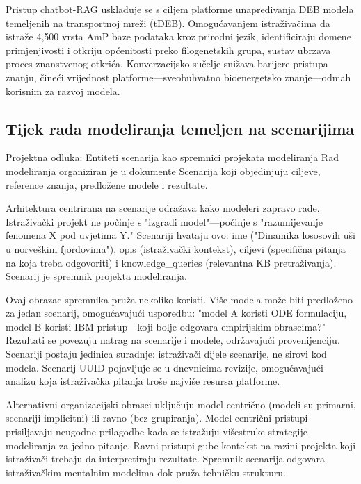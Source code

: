 \documentclass[12pt,a4paper]{article}
\begin{document}
Pristup chatbot-RAG usklađuje se s ciljem platforme unapređivanja DEB modela temeljenih na transportnoj mreži (tDEB). Omogućavanjem istraživačima da istraže 4,500 vrsta AmP baze podataka kroz prirodni jezik, identificiraju domene primjenjivosti i otkriju općenitosti preko filogenetskih grupa, sustav ubrzava proces znanstvenog otkrića. Konverzacijsko sučelje snižava barijere pristupa znanju, čineći vrijednost platforme—sveobuhvatno bioenergetsko znanje—odmah korisnim za razvoj modela.

\subsection{Tijek rada modeliranja temeljen na scenarijima}

\begin{rationale}{Projektna odluka: Entiteti scenarija kao spremnici projekata modeliranja}
Rad modeliranja organiziran je u dokumente Scenarija koji objedinjuju ciljeve, reference znanja, predložene modele i rezultate.
\end{rationale}

Arhitektura centrirana na scenarije odražava kako modeleri zapravo rade. Istraživački projekt ne počinje s "izgradi model"—počinje s "razumijevanje fenomena X pod uvjetima Y." Scenariji hvataju ovo: ime ("Dinamika lososovih uši u norveškim fjordovima"), opis (istraživački kontekst), ciljevi (specifična pitanja na koja treba odgovoriti) i knowledge\_queries (relevantna KB pretraživanja). Scenarij je spremnik projekta modeliranja.

Ovaj obrazac spremnika pruža nekoliko koristi. Više modela može biti predloženo za jedan scenarij, omogućavajući usporedbu: "model A koristi ODE formulaciju, model B koristi IBM pristup—koji bolje odgovara empirijskim obrascima?" Rezultati se povezuju natrag na scenarije i modele, održavajući provenijenciju. Scenariji postaju jedinica suradnje: istraživači dijele scenarije, ne sirovi kod modela. Scenarij UUID pojavljuje se u dnevnicima revizije, omogućavajući analizu koja istraživačka pitanja troše najviše resursa platforme.

Alternativni organizacijski obrasci uključuju model-centrično (modeli su primarni, scenariji implicitni) ili ravno (bez grupiranja). Model-centrični pristupi prisiljavaju neugodne prilagodbe kada se istražuju višestruke strategije modeliranja za jedno pitanje. Ravni pristupi gube kontekst na razini projekta koji istraživači trebaju da interpretiraju rezultate. Spremnik scenarija odgovara istraživačkim mentalnim modelima dok pruža tehničku strukturu.
\end{document}
